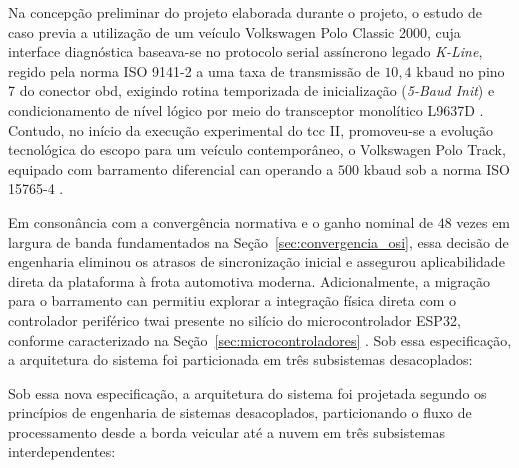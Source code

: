 \documentclass[
	12pt,				%
	openright,			%
	twoside,			%
	a4paper,			%
	english,			%
	brazil				%
	]{abntex2}
\begin{document}
Na concepção preliminar do projeto elaborada durante o projeto, o estudo de
caso previa a utilização de um veículo Volkswagen Polo Classic 2000, cuja interface
diagnóstica baseava-se no protocolo serial assíncrono legado \textit{K-Line}, regido
pela norma ISO 9141-2 a uma taxa de transmissão de $10{,}4\text{ kbaud}$ no pino 7 do
conector \acrshort{obd}, exigindo rotina temporizada de inicialização
(\textit{5-Baud Init}) e condicionamento de nível lógico por meio do transceptor
monolítico L9637D \cite{l9637d_datasheet}. Contudo, no início da execução experimental
do \acrshort{tcc} II, promoveu-se a evolução tecnológica do escopo para um veículo
contemporâneo, o Volkswagen Polo Track, equipado com barramento diferencial
\acrshort{can} operando a $500\text{ kbaud}$ sob a norma ISO 15765-4 \cite{iso15765}.

Em consonância com a convergência normativa e o ganho nominal de $48$ vezes em largura
de banda fundamentados na Seção~\ref{sec:convergencia_osi}, essa decisão de engenharia
eliminou os atrasos de sincronização inicial e assegurou aplicabilidade direta da
plataforma à frota automotiva moderna. Adicionalmente, a migração para o barramento
\acrshort{can} permitiu explorar a integração física direta com o controlador periférico
\acrshort{twai} presente no silício do microcontrolador ESP32, conforme caracterizado na
Seção~\ref{sec:microcontroladores} \cite{espressif_esp32_datasheet}. Sob essa
especificação, a arquitetura do sistema foi particionada em três subsistemas
desacoplados:

Sob essa nova especificação, a arquitetura do sistema foi projetada segundo os
princípios de engenharia de sistemas desacoplados, particionando o fluxo de
processamento desde a borda veicular até a nuvem em três subsistemas interdependentes:
\end{document}
